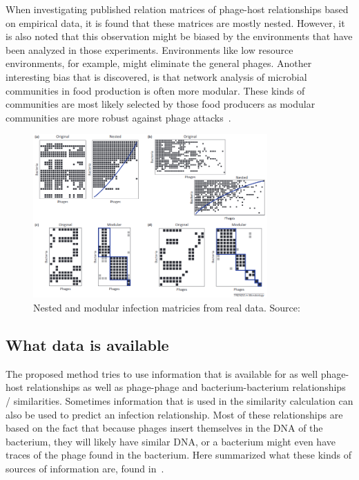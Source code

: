 \documentclass{article}
\begin{document}
When investigating published relation matrices of phage-host relationships 
based on empirical data, it is found that these matrices are mostly nested.
However, it is also noted that this observation might be biased by the environments
that have been analyzed in those experiments. Environments like low resource environments,
for example, might eliminate the general phages. Another interesting bias that is discovered,
is that network analysis of microbial communities in food production is often
more modular. These kinds of communities are most likely selected by those food producers
as modular communities are more robust against phage attacks~\cite{weitz2013phage}.

\begin{figure}[htb]
\centering
\includegraphics[width=0.8\textwidth]{img/nested-vs-modular.png}
\caption{Nested and modular infection matricies from real data. Source:~\cite{weitz2013phage}}
\end{figure}

\subsection{What data is available}

The proposed method tries to use information that is available for as well
phage-host relationships as well as phage-phage and bacterium-bacterium
relationships / similarities. Sometimes information that is used in the 
similarity calculation can also be used to predict an infection relationship.
Most of these relationships are based on the fact that because phages insert
themselves in the DNA of the bacterium, they will likely have similar DNA, 
or a bacterium might even have traces of the phage found in the bacterium.
Here summarized what these kinds of sources
of information are, found in~\cite{edwards2016computational}.
\end{document}
